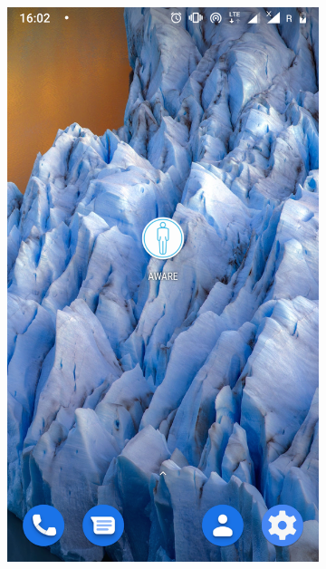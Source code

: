 \begin{enumerate}
	\begin{figure}[H]
		\centering
		\begin{subfigure}{0.35\textwidth}
			\centering
			\includegraphics[scale=0.13]{dodatekA/3_1.png}
			\subcaption{\label{subfigure_a}}
		\end{subfigure}
		\begin{subfigure}{0.35\textwidth}
			\centering

\end{subfigure}
\end{figure}
\end{enumerate}
